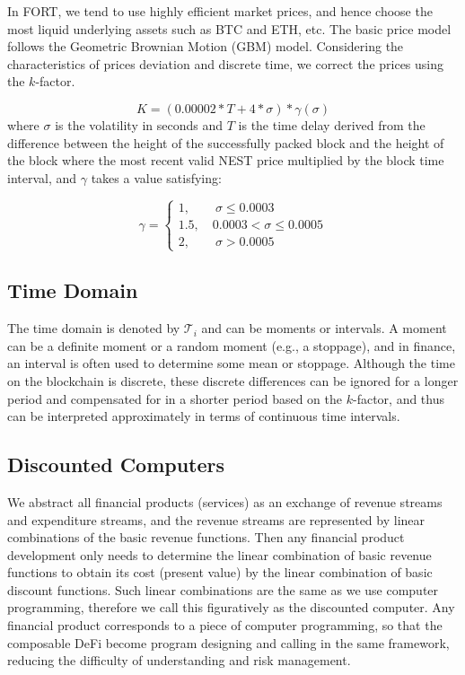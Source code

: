 \documentclass[letterpaper,12pt]{article}
\begin{document}
In FORT, we tend to use highly efficient market prices, and hence choose the most liquid underlying assets such as BTC and ETH, etc. The basic price model follows the Geometric Brownian Motion (GBM) model. Considering the characteristics of prices deviation and discrete time, we correct the prices using the $k$-factor.

\begin{equation} 
K =(0.00002 * T + 4 * \sigma) * \gamma(\sigma)
\end{equation}
where $\sigma$ is the volatility in seconds and $T$ is the time delay derived from the difference between the height of the successfully packed block and the height of the block where the most recent valid NEST price multiplied by the block time interval, and $\gamma$ takes a value satisfying:

\begin{equation} 
\gamma =\begin{cases}1,\qquad \sigma \leq 0.0003\\
1.5,\quad 0.0003 <\sigma \leq 0.0005\\
2,\qquad \sigma  >0.0005\end{cases}
\end{equation}

\subsection{Time Domain}

The time domain is denoted by $\mathcal{T}_i$ and can be moments or intervals. 
A moment can be a definite moment or a random moment (e.g., a stoppage), and in finance, an interval is often used to determine some mean or stoppage. 
Although the time on the blockchain is discrete, these discrete differences can be ignored for a longer period and compensated for in a shorter period based on the $k$-factor, and thus can be interpreted approximately in terms of continuous time intervals.

\subsection{Discounted Computers}

We abstract all financial products (services) as an exchange of revenue streams and expenditure streams, and the revenue streams are represented by linear combinations of the basic revenue functions. 
Then any financial product development only needs to determine the linear combination of basic revenue functions to obtain its cost (present value) by the linear combination of basic discount functions. 
Such linear combinations are the same as we use computer programming, therefore we call this figuratively as the discounted computer.
Any financial product corresponds to a piece of computer programming, so that the composable DeFi become program designing and calling in the same framework, reducing the difficulty of understanding and risk management.
\end{document}
